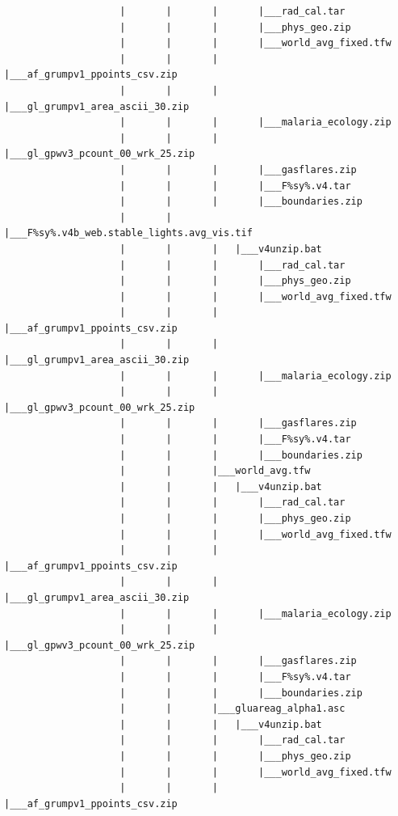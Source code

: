 \documentclass[
]{book}
\begin{document}
\begin{verbatim}
                    |       |       |       |___rad_cal.tar
                    |       |       |       |___phys_geo.zip
                    |       |       |       |___world_avg_fixed.tfw
                    |       |       |       |___af_grumpv1_ppoints_csv.zip
                    |       |       |       |___gl_grumpv1_area_ascii_30.zip
                    |       |       |       |___malaria_ecology.zip
                    |       |       |       |___gl_gpwv3_pcount_00_wrk_25.zip
                    |       |       |       |___gasflares.zip
                    |       |       |       |___F%sy%.v4.tar
                    |       |       |       |___boundaries.zip
                    |       |       |___F%sy%.v4b_web.stable_lights.avg_vis.tif
                    |       |       |   |___v4unzip.bat
                    |       |       |       |___rad_cal.tar
                    |       |       |       |___phys_geo.zip
                    |       |       |       |___world_avg_fixed.tfw
                    |       |       |       |___af_grumpv1_ppoints_csv.zip
                    |       |       |       |___gl_grumpv1_area_ascii_30.zip
                    |       |       |       |___malaria_ecology.zip
                    |       |       |       |___gl_gpwv3_pcount_00_wrk_25.zip
                    |       |       |       |___gasflares.zip
                    |       |       |       |___F%sy%.v4.tar
                    |       |       |       |___boundaries.zip
                    |       |       |___world_avg.tfw
                    |       |       |   |___v4unzip.bat
                    |       |       |       |___rad_cal.tar
                    |       |       |       |___phys_geo.zip
                    |       |       |       |___world_avg_fixed.tfw
                    |       |       |       |___af_grumpv1_ppoints_csv.zip
                    |       |       |       |___gl_grumpv1_area_ascii_30.zip
                    |       |       |       |___malaria_ecology.zip
                    |       |       |       |___gl_gpwv3_pcount_00_wrk_25.zip
                    |       |       |       |___gasflares.zip
                    |       |       |       |___F%sy%.v4.tar
                    |       |       |       |___boundaries.zip
                    |       |       |___gluareag_alpha1.asc
                    |       |       |   |___v4unzip.bat
                    |       |       |       |___rad_cal.tar
                    |       |       |       |___phys_geo.zip
                    |       |       |       |___world_avg_fixed.tfw
                    |       |       |       |___af_grumpv1_ppoints_csv.zip

\end{verbatim}
\end{document}

